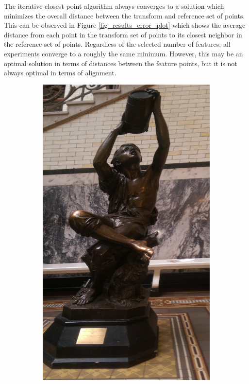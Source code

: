 \documentclass{article}
\begin{document}
The iterative closest point algorithm always converges to a solution which minimizes the overall distance between the transform and reference set of points. This can be observed in Figure \ref{fig_results_error_plot} which shows the average distance from each point in the transform set of points to its closest neighbor in the reference set of points. Regardless of the selected number of features, all experiments converge to a roughly the same minimum. However, this may be an optimal solution in terms of distances between the feature points, but it is not always optimal in terms of alignment. 

\begin{figure}
	\centering
	\begin{subfigure}[b]{0.3\textwidth}
		\centering
		\includegraphics[width=\textwidth]{figures/alignment/waterboy_left}

\end{subfigure}
\end{figure}
\end{document}
